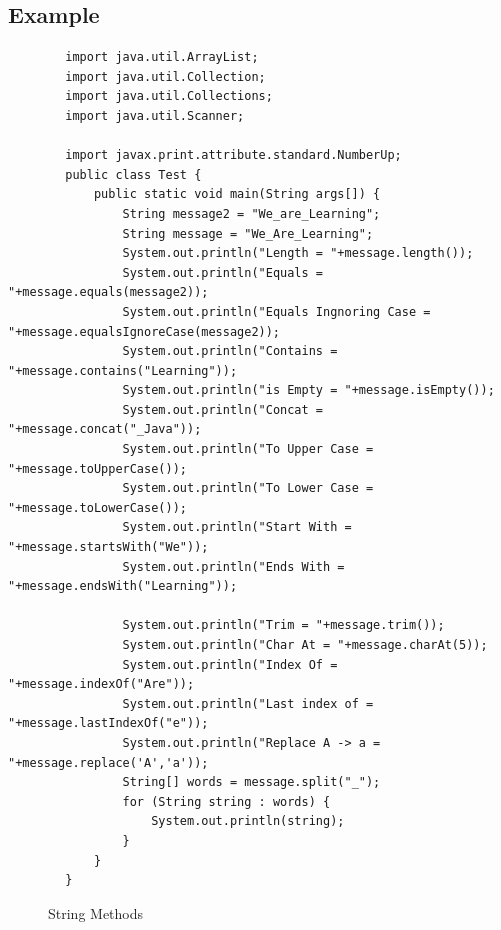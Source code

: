 \documentclass[openany]{book}  %
\begin{document}
\subsection{Example}
\begin{center}
    \footnotesize
    \begin{verbatim}
        import java.util.ArrayList;
        import java.util.Collection;
        import java.util.Collections;
        import java.util.Scanner;

        import javax.print.attribute.standard.NumberUp;
        public class Test {
            public static void main(String args[]) {
                String message2 = "We_are_Learning";
                String message = "We_Are_Learning";
                System.out.println("Length = "+message.length());
                System.out.println("Equals = "+message.equals(message2));
                System.out.println("Equals Ingnoring Case = "+message.equalsIgnoreCase(message2));
                System.out.println("Contains = "+message.contains("Learning"));
                System.out.println("is Empty = "+message.isEmpty());
                System.out.println("Concat = "+message.concat("_Java"));
                System.out.println("To Upper Case = "+message.toUpperCase());
                System.out.println("To Lower Case = "+message.toLowerCase());
                System.out.println("Start With = "+message.startsWith("We"));
                System.out.println("Ends With = "+message.endsWith("Learning"));

                System.out.println("Trim = "+message.trim());
                System.out.println("Char At = "+message.charAt(5));
                System.out.println("Index Of = "+message.indexOf("Are"));
                System.out.println("Last index of = "+message.lastIndexOf("e"));
                System.out.println("Replace A -> a = "+message.replace('A','a'));
                String[] words = message.split("_");
                for (String string : words) {
                    System.out.println(string);
                }
            }
        }
    \end{verbatim}
\end{center}
% 
% 
\begin{figure}[htbp]
    \begin{center}
        \caption{String Methods\cite{Ref3}}
    \end{center}
\end{figure}
\end{document}
